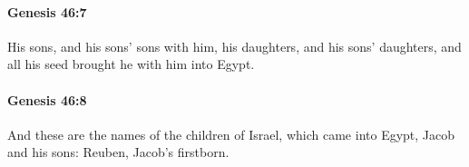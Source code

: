 		\paragraph{Genesis 46:7} %
			\label{GENESIS-46-7}

			His sons, and his sons' sons with him, his daughters, and his sons' daughters, and all his seed brought he with him into Egypt.


		\paragraph{Genesis 46:8} %
			\label{GENESIS-46-8}

			And these are the names of the children of Israel, which came into Egypt, Jacob and his sons: Reuben, Jacob's firstborn.


